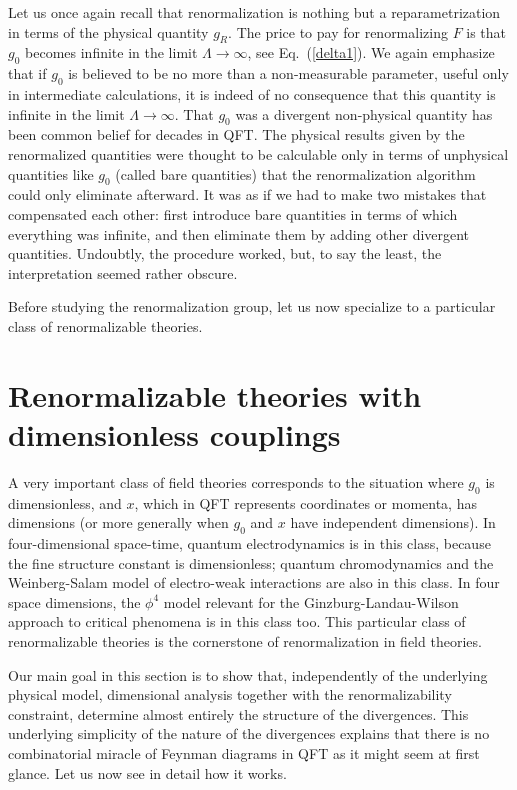\documentclass[floatfix,preprintnumbers,amsmath,amssymb,prb,12pt]{revtex4-1}
\begin{document}
Let us once again recall that renormalization is nothing but a
reparametrization in terms of the physical quantity
$g_R$.\cite{foot7} The price to pay for renormalizing $F$ is that
$g_0$ becomes infinite in the limit
$\Lambda\to\infty$, see Eq.~(\ref{delta1}). We again emphasize
that if $g_0$ is believed to be no more than a non-measurable
parameter, useful only in intermediate calculations, it is indeed
of no consequence that this quantity is infinite in the limit
$\Lambda\to\infty$. That $g_0$ was a divergent non-physical
quantity has been common belief for decades in QFT. The physical
results given by the renormalized quantities were thought to be
calculable only in terms of unphysical quantities like $g_0$
(called bare quantities) that the renormalization algorithm 
could only eliminate afterward. It was as if we had to make two
mistakes that compensated each other: first introduce bare
quantities in terms of which everything was infinite, and then
eliminate them by adding other divergent quantities. Undoubtly,
the procedure worked, but, to say the least, the interpretation
seemed rather obscure.

Before studying the renormalization group, let us now specialize to
a particular class of renormalizable theories.

\section{Renormalizable theories with dimensionless couplings}
A very important class of field theories corresponds to the
situation where $g_0$ is dimensionless, and $x$, which in QFT
represents coordinates or momenta, has dimensions (or more
generally when $g_0$ and $x$ have independent dimensions). In
four-dimensional space-time, quantum
electrodynamics is in this class, because the fine structure
constant is dimensionless; quantum chromodynamics
and the Weinberg-Salam model of electro-weak interactions are
also in this class. In four space
dimensions, the $\phi^4$ model 
relevant for the Ginzburg-Landau-Wilson approach to critical
phenomena is in this class too. This particular class of renormalizable
theories is the cornerstone of renormalization in field theories.

Our main goal in this section is to show that, independently of
the underlying physical model, dimensional analysis together with
the renormalizability constraint, determine almost entirely the
structure of the divergences. This underlying simplicity of the
nature of the divergences explains that there is no
combinatorial miracle of Feynman diagrams in QFT as it might seem
at first glance. Let us now see in detail how it works.
\end{document}
